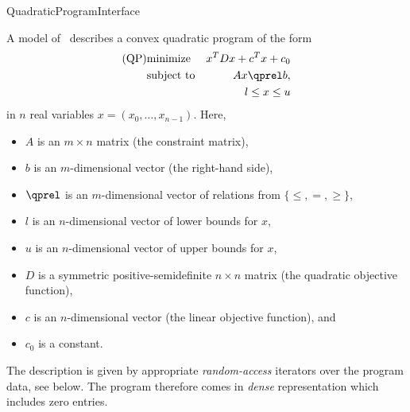 \begin{ccRefConcept}{QuadraticProgramInterface}

\ccDefinition
A model of \ccRefName\ describes a convex quadratic program of the form
\begin{eqnarray*}
\mbox{(QP)}& \mbox{minimize} & x^{T}Dx+c^{T}x+c_0 \\
&\mbox{subject to}   & Ax\qprel b, \\
&                    & l \leq x \leq u
\end{eqnarray*}
in $n$ real variables $x=(x_0,\ldots,x_{n-1})$.
Here, 
\begin{itemize}
\item $A$ is an $m\times n$ matrix (the constraint matrix), 
\item $b$ is an $m$-dimensional vector (the right-hand side),
\item $\qprel$ is an $m$-dimensional vector of relations 
from $\{\leq, =, \geq\}$, 
\item $l$ is an $n$-dimensional vector of lower
bounds for $x$,
\item $u$ is an $n$-dimensional vector of upper bounds for
$x$, 
\item $D$ is a symmetric positive-semidefinite $n\times n$ matrix (the
  quadratic objective function),
\item $c$ is an $n$-dimensional vector (the linear objective
  function), and 
\item $c_0$ is a constant.
\end{itemize}

The description is given by appropriate \emph{random-access} 
iterators over the program data, see below. The program therefore 
comes in \emph{dense} representation which includes zero entries.

\ccHasModels
{}\\
\\
\\
\\

\ccTypes



\end{ccRefConcept}
